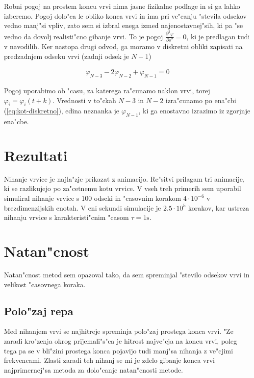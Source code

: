 \documentclass[a4paper,10pt]{article}
\renewcommand{\phi}{\varphi}
\newcommand{\parcdva}[2]{
  \frac{\partial^2 #1}{\partial #2 ^2}
}
\begin{document}
Robni pogoj na prostem koncu vrvi nima jasne fizikalne podlage in si ga lahko izberemo. Pogoj dolo"ca le obliko konca vrvi in ima pri ve"canju "stevila odsekov vedno manj"si vpliv, zato sem si izbral enega izmed najenostavnej"sih, ki pa "se vedno da dovolj realisti"cno gibanje vrvi. To je pogoj $\parcdva{\phi}{s}=0$, ki je predlagan tudi v navodilih. Ker nastopa drugi odvod, ga moramo v diskretni obliki zapisati na predzadnjem odseku vrvi (zadnji odsek je $N-1$)

\begin{align}
 \phi_{N-3} -2\phi_{N-2} + \phi_{N-1} = 0
\end{align}

Pogoj uporabimo ob "casu, za katerega ra"cunamo naklon vrvi, torej $\phi_i = \phi_i(t+k)$. Vrednosti v to"ckah $N-3$ in $N-2$ izra"cunamo po ena"cbi (\ref{eq:kot-diskretno}), edina neznanka je $\phi_{N-1}$, ki ga enostavno izrazimo iz zgorjnje ena"cbe. 

\section{Rezultati}

Nihanje vrvice je najla"zje prikazat z animacijo. Re"sitvi prilagam tri animacije, ki se razlikujejo po za"cetnemu kotu vrvice. V vseh treh primerih sem uporabil simuliral nihanje vrvice s 100 odseki in "casovnim korakom $4 \cdot 10^{-6}$ v brezdimenzijskih enotah. V eni sekundi simulacije je $2.5 \cdot 10^5$ korakov, kar ustreza nihanju vrvice s karakteristi"cnim "casom $\tau = 1\mathrm{s}$. 

\section{Natan"cnost}

Natan"cnost metod sem opazoval tako, da sem spreminjal "stevilo odsekov vrvi in velikost "casovnega koraka. 

\subsection{Polo"zaj repa}

Med nihanjem vrvi se najhitreje spreminja polo"zaj prostega konca vrvi. "Ze zaradi kro"zenja okrog prijemali"s"ca je hitrost najve"cja na koncu vrvi, poleg tega pa se v bli"zini prostega konca pojavijo tudi manj"sa nihanja z ve"cjimi frekvencami. Zlasti zaradi teh nihanj se mi je zdelo gibanje konca vrvi najprimernej"sa metoda za dolo"canje natan"cnosti metode. 
\end{document}
